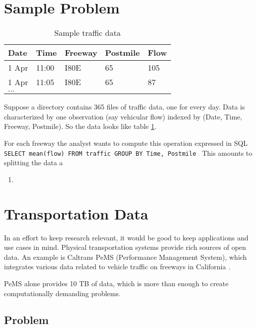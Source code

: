 \documentclass[12pt]{article}
\begin{document}
\section{Sample Problem}

\begin{table}
    \begin{tabular}{| l | l | l | l | l |}
    \hline
        Date & Time & Freeway & Postmile & Flow \\ \hline
        1 Apr & 11:00 & I80E & 65 & 105 \\ 
        1 Apr & 11:05 & I80E & 65 & 87 \\ 
        $\dots$ & & & & \\ \hline
    \end{tabular}
    \caption{Sample traffic data}
    \label{table:traffic}
\end{table}

Suppose a directory contains 365 files of traffic data, one for every day.
Data is characterized by one observation (say vehicular flow)
indexed by (Date, Time, Freeway, Postmile). So the data looks like table
\ref{table:traffic}.

For each freeway the analyst wants to compute this operation expressed in SQL
\texttt{
    SELECT mean(flow) FROM traffic GROUP BY Time, Postmile
}
This amounts to splitting the data a

\begin{enumerate}
    \item 
\end{enumerate}


\section{Transportation Data}

In an effort to keep research relevant, it would be good to keep
applications and use cases in mind. Physical transportation systems provide
rich sources of open data. An example is Caltrans PeMS (Performance
Management System), which integrates various data related to vehicle
traffic on freeways in California \cite{jia2001pems}.

PeMS alone provides 10 TB of data, which is more than enough to create
computationally demanding problems.

\subsection{Problem}
\end{document}
